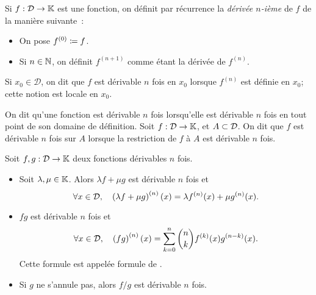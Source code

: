 \documentclass{magnoliaold}
\begin{document}
\begin{definition}[utile=-3]
Si $f:\mathcal{D}\to\mathbb{K}$ est une fonction, on définit par récurrence
la \emph{dérivée $n$-ième} de $f$ de la manière suivante~:
\begin{itemize}
\item On pose $f^{(0)}\coloneqq f$.
\item Si $n\in\mathbb{N}$, on définit $f^{(n+1)}$ comme étant la dérivée  de $f^{(n)}$.
\end{itemize}
Si $x_0\in\mathcal{D}$, on dit que $f$ est dérivable $n$ fois en $x_0$
lorsque $f^{(n)}$ est définie en $x_0$; cette notion est locale en $x_0$.
\end{definition}

\begin{remarques}
\remarque On dit qu'une fonction est dérivable $n$ fois lorsqu'elle est
  dérivable $n$ fois en tout point de son domaine de définition.
\remarque Soit $f:\mathcal{D}\to\mathbb{K}$, et $A\subset\mathcal{D}$. On dit que $f$ est
  dérivable $n$ fois sur $A$ lorsque la restriction de $f$ à $A$ est dérivable
  $n$ fois.
\end{remarques}

\begin{proposition}[utile=-3]
Soit $f, g:\mathcal{D}\to\mathbb{K}$ deux fonctions dérivables $n$ fois.
\begin{itemize}
\item Soit $\lambda,\mu\in\mathbb{K}$. Alors $\lambda f+\mu g$ est dérivable $n$
  fois et
  \[\forall x\in\mathcal{D} ,\quad
    \left(\lambda f+\mu g\right)^{(n)}(x)=\lambda f^{(n)}(x)+\mu g^{(n)}(x).\]
\item $fg$ est dérivable $n$ fois et
  \[\forall x\in \mathcal{D} ,\quad
    \left(fg\right)^{(n)}(x)=\sum_{k=0}^n \binom{n}{k} f^{(k)}(x)g^{(n-k)}(x).\]
  Cette formule est appelée formule de .
\item Si $g$ ne s'annule pas, alors $f/g$ est dérivable $n$ fois.
\end{itemize}
\end{proposition}
\end{document}
